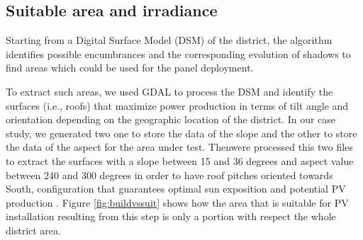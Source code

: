 \subsection{Suitable area and irradiance}
\label{subsec:suitablearea}
Starting from a Digital Surface Model (DSM) of the district, the algorithm identifies possible encumbrances and the corresponding evolution of  shadows to find areas which could be used for the panel deployment. 

To extract such areas, we used GDAL\cite{gdal} to process the DSM and identify the surfaces (i.e., roofs) that maximize power production in terms of tilt angle and orientation depending on the geographic location of the district. In our case study, we generated two  one to store the data of the slope and the other to store the data of the aspect for the area under test. Thenwere processed this two files  to extract the surfaces with a slope between 15 and 36 degrees and aspect value between 240 and 300 degrees in order to have roof pitches oriented towards South, configuration that guarantees optimal sun exposition and potential PV production \cite{tilt}. Figure \ref{fig:buildvssuit} shows how the area that is suitable for PV installation resulting from this step is only a portion with respect the whole district area.


